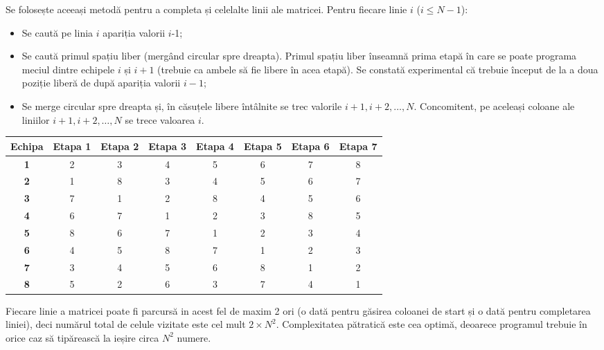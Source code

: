 Se folosește aceeași metodă pentru a completa și celelalte linii ale
matricei. Pentru fiecare linie $i$ ($i \leq N-1$):

\begin{itemize}

\item Se caută pe linia $i$ apariția valorii $i$-1;

\item Se caută primul spațiu liber (mergând circular spre dreapta). Primul
  spațiu liber înseamnă prima etapă în care se poate programa meciul dintre
  echipele $i$ și $i+1$ (trebuie ca ambele să fie libere în acea etapă). Se
  constată experimental că trebuie început de la a doua poziție liberă de după
  apariția valorii $i-1$;

\item Se merge circular spre dreapta și, în căsuțele libere întâlnite se trec
  valorile $i+1, i+2, \dots, N$. Concomitent, pe aceleași coloane ale liniilor
  $i+1, i+2, \dots, N$ se trece valoarea $i$.

\end{itemize}

\begin{table}[H]
  \setlength{\tabcolsep}{5pt}
  \centering
  \begin{tabular}{c|ccccccc}
    \hline
        {\bf Echipa} & {\bf Etapa 1} & {\bf Etapa 2} & {\bf Etapa 3} &
        {\bf Etapa 4} & {\bf Etapa 5} & {\bf Etapa 6} & {\bf Etapa 7} \\ \hline
        {\bf 1} & 2 & 3 & 4 & 5 & 6 & 7 & 8 \\
        {\bf 2} & 1 & 8 & 3 & 4 & 5 & 6 & 7 \\
        {\bf 3} & 7 & 1 & 2 & 8 & 4 & 5 & 6 \\
        {\bf 4} & 6 & 7 & 1 & 2 & 3 & 8 & 5 \\
        {\bf 5} & 8 & 6 & 7 & 1 & 2 & 3 & 4 \\
        {\bf 6} & 4 & 5 & 8 & 7 & 1 & 2 & 3 \\
        {\bf 7} & 3 & 4 & 5 & 6 & 8 & 1 & 2 \\
        {\bf 8} & 5 & 2 & 6 & 3 & 7 & 4 & 1 \\
        \hline
  \end{tabular}
\end{table}

Fiecare linie a matricei poate fi parcursă in acest fel de maxim 2 ori (o dată
pentru găsirea coloanei de start și o dată pentru completarea liniei), deci
numărul total de celule vizitate este cel mult $2 \times N^2$. Complexitatea
pătratică este cea optimă, deoarece programul trebuie în orice caz să
tipărească la ieșire circa $N^2$ numere.

